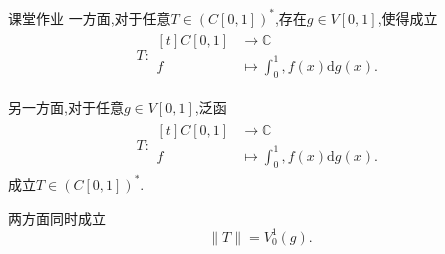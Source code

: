 \documentclass[lang = cn, scheme = chinese]{elegantbook}
\begin{document}
	\begin{proposition}{课堂作业}
		一方面,对于任意$T\in (C[0,1])^*$,存在$g\in V[0,1]$,使得成立
		\begin{align*}
			T:\begin{aligned}[t]
				C[0,1]&\longrightarrow \mathbb{C}\\
				f&\longmapsto \int_0^1, f(x)\mathrm{d}g(x).
			\end{aligned}
		\end{align*}
		
		另一方面,对于任意$g\in V[0,1]$,泛函
		\begin{align*}
			T:\begin{aligned}[t]
				C[0,1]&\longrightarrow \mathbb{C}\\
				f&\longmapsto \int_0^1, f(x)\mathrm{d}g(x).
			\end{aligned}
		\end{align*}
		成立$T\in (C[0,1])^*$.
		
		两方面同时成立
		$$
		\|T\|=V_0^1(g).
		$$
	\end{proposition}
\end{document}
